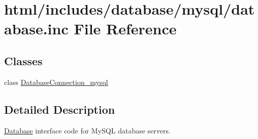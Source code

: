 \hypertarget{mysql_2database_8inc}{
\section{html/includes/database/mysql/database.inc File Reference}
\label{mysql_2database_8inc}
}
\subsection*{Classes}
\begin{DoxyCompactItemize}
\item 
class \hyperlink{classDatabaseConnection__mysql}{DatabaseConnection\_\-mysql}
\end{DoxyCompactItemize}


\subsection{Detailed Description}
\hyperlink{classDatabase}{Database} interface code for MySQL database servers. 